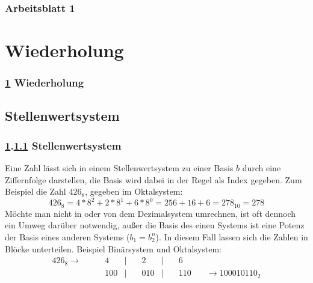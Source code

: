 \documentclass[9pt,german]{beamer}%
\begin{document}
\maketitle%
\addtocounter{framenumber}{-1}%

\begin{frame}
  \frametitle{Arbeitsblatt 1}%
\tableofcontents[hideallsubsections]
\end{frame}

\section{Wiederholung}\label{K:wdh}
\begin{frame}
  \frametitle{\ref{K:wdh} Wiederholung}%
\tableofcontents[current]
\end{frame}


\def\stitle{Stellenwertsystem}
\subsection{\stitle}\label{S:Stellenwertsystem}
\begin{frame}[fragile]%
  \frametitle{\ref{K:wdh}.\ref{S:Stellenwertsystem} \stitle}%
\medskip

Eine Zahl l\"asst sich in einem Stellenwertsystem zu einer Basis $b$ durch eine Ziffernfolge darstellen, die Basis wird dabei in der Regel als Index gegeben.
Zum Beispiel die Zahl $426_8$, gegeben im Oktalsystem:
\begin{equation*}
426_8 = 4*8^2 + 2*8^1 + 6*8^0 = 256 + 16 + 6 = 278_{10} = 278
\end{equation*}
M\"ochte man nicht in oder von dem Dezimalsystem umrechnen, ist oft dennoch ein Umweg dar\"uber notwendig, au\ss er die Basis des einen Systems ist eine Potenz der Basis eines anderen Systems ($b_1 = b_2^n$).
In diesem Fall lassen sich die Zahlen in Bl\"ocke unterteilen.
Beispiel Bin\"arsystem und Oktalsystem:
\begin{align*}
426_8 \rightarrow \quad & \quad   4 & | & \quad   2 & | & \quad   6 & \\
                        & \quad 100 & | & \quad 010 & | & \quad 110 & \quad \rightarrow 100010110_2
\end{align*}

\end{frame}
\end{document}

